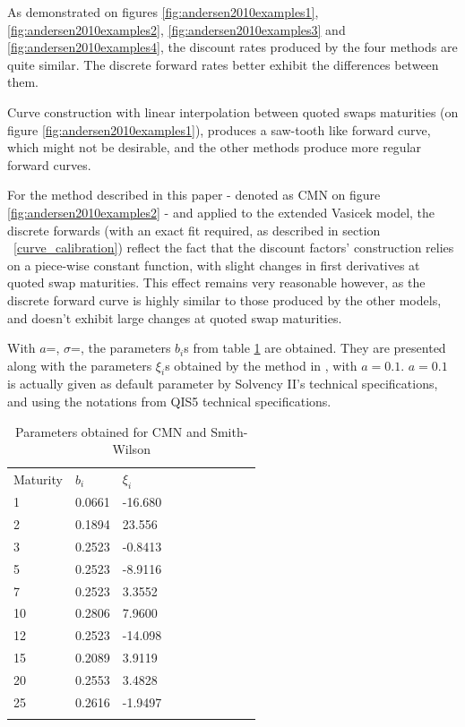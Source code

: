 As demonstrated on figures \ref{fig:andersen2010examples1}, \ref{fig:andersen2010examples2}, \ref{fig:andersen2010examples3} and \ref{fig:andersen2010examples4}, the discount rates produced by the four methods are quite similar. The discrete forward rates better exhibit the differences between them. 

\medskip

Curve construction with linear interpolation between quoted swaps maturities (on figure \ref{fig:andersen2010examples1}), produces a saw-tooth like forward curve, which might not be desirable, and the other methods produce more regular forward curves.

\medskip

For the method described in this paper - denoted as CMN on figure \ref{fig:andersen2010examples2} - and applied to the extended Vasicek model, the discrete forwards (with an exact fit required, as described in section ~\ref{curve_calibration}) reflect the fact that the discount factors' construction relies on a piece-wise constant function, with slight changes in first derivatives at quoted swap maturities. This effect remains very reasonable however, as the discrete forward curve is highly similar to those produced by the other models, and doesn't exhibit large changes at quoted swap maturities.

\medskip

With $a$=, $\sigma$=, the parameters $b_i$s from table \ref{tab:andersen2010tables1} are obtained. They are presented along with the parameters $\xi_i$s obtained by the method in \cite{smithwilson2001}, with $a = 0.1$. $a = 0.1$ is actually given as default parameter by Solvency II's  technical specifications, and using the notations from QIS5 technical specifications.


\begin{table}[!htb]
\begin{center}
\caption{Parameters obtained for CMN and Smith-Wilson}
\label{tab:andersen2010tables1}       %
\begin{tabular}{llllllllll}
\hline\noalign{\smallskip}
Maturity & $b_i$ & $\xi_i$  \\
\noalign{\smallskip}\hline\noalign{\smallskip}
  1 & 0.0661  & -16.680\\
  2 & 0.1894  & 23.556\\
  3 & 0.2523  & -0.8413\\
  5 & 0.2523  & -8.9116\\
  7 & 0.2523  & 3.3552\\
  10 & 0.2806 & 7.9600\\
  12 & 0.2523 & -14.098\\
  15 & 0.2089 & 3.9119\\
  20 & 0.2553 & 3.4828\\
  25 & 0.2616 & -1.9497\\
\noalign{\smallskip}\hline
\end{tabular}
\end{center}
\end{table}

